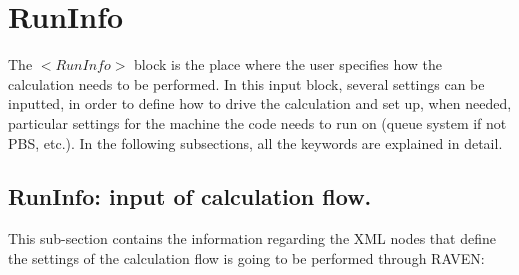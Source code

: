 \section{RunInfo  \\ \vspace{2 mm} {\small }}
The $<RunInfo>$ block is the place where the user specifies how the calculation needs to be performed. In this input block, several settings can be inputted, in order to define how to drive the calculation and set up, when needed, particular settings for the machine the code needs to run on (queue system if not PBS, etc.).
In the following subsections, all the keywords are explained in detail.

\subsection{RunInfo: input of calculation flow.}
\label{subsec:runinfoCalcFlow}
This sub-section contains the information regarding the XML nodes that define the settings of the calculation flow is going to be performed through RAVEN:

